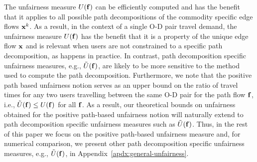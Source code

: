 \documentclass{article}
\newif\ifarxiv   %
\begin{document}

The unfairness measure $U(\mathbf{f})$ can be efficiently computed and has the benefit that it applies to all possible path decompositions of the commodity specific edge flows $\mathbf{x}^k$. As a result, in the context of a single O-D pair travel demand, the unfairness measure $U(\mathbf{f})$ has the benefit that it is a property of the unique edge flow $\mathbf{x}$ and is relevant when users are not constrained to a specific path decomposition, as happens in practice. In contrast, path decomposition specific unfairness measures, e.g., $\Tilde{U}(\mathbf{f})$, are likely to be more sensitive to the method used to compute the path decomposition. Furthermore, we note that the positive path based unfairness notion serves as an upper bound on the ratio of travel times for any two users travelling between the same O-D pair for the path flow $\mathbf{f}$, i.e., $\Tilde{U}(\mathbf{f}) \leq U(\mathbf{f})$ for all $\mathbf{f}$. As a result, our theoretical bounds on unfairness obtained for the positive path-based unfairness notion will naturally extend to path decomposition specific unfairness measures such as $\Tilde{U}(\mathbf{f})$. Thus, in the rest of this paper we focus on the positive path-based unfairness measure and, for numerical comparison, we present other path decomposition specific unfairness measures, e.g., $\Tilde{U}(\mathbf{f})$, in Appendix~\ref{apdx:general-unfairness}.
\end{document}
